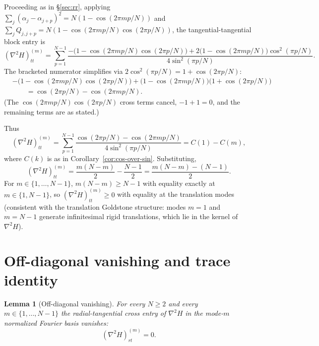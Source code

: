 \documentclass[11pt]{article}
\newtheorem{lemma}{Lemma}
\theoremstyle{remark}
\begin{document}
Proceeding as in \S\ref{sec:rr}, applying
$\sum_j (\alpha_j - \alpha_{j+p})^2 = N(1 - \cos(2\pi m p / N))$
and $\sum_j Q_{j, j+p} = N(1 - \cos(2\pi m p / N)\cos(2\pi p / N))$,
the tangential-tangential block entry is
\begin{equation}\label{eq:tt-intermediate}
  (\nabla^2 H)_{tt}^{(m)}
   = \sum_{p=1}^{N-1}
     \frac{-\bigl(1 - \cos(2\pi m p / N)\cos(2\pi p / N)\bigr)
           + 2\bigl(1 - \cos(2\pi m p / N)\bigr)\cos^2(\pi p / N)}
          {4 \sin^2(\pi p / N)}.
\end{equation}
The bracketed numerator simplifies via
$2\cos^2(\pi p / N) = 1 + \cos(2\pi p / N)$:
\begin{align*}
  &-\bigl(1 - \cos(2\pi m p / N)\cos(2\pi p / N)\bigr)
     + \bigl(1 - \cos(2\pi m p / N)\bigr)\bigl(1 + \cos(2\pi p / N)\bigr) \\
  &\qquad = \cos(2\pi p / N) - \cos(2\pi m p / N).
\end{align*}
(The $\cos(2\pi m p / N)\cos(2\pi p / N)$ cross terms cancel,
$-1 + 1 = 0$, and the remaining terms are as stated.)

Thus
\begin{equation}\label{eq:tt-diff-C}
  (\nabla^2 H)_{tt}^{(m)}
   = \sum_{p=1}^{N-1}\frac{\cos(2\pi p / N) - \cos(2\pi m p / N)}
                          {4 \sin^2(\pi p / N)}
   = C(1) - C(m),
\end{equation}
where $C(k)$ is as in Corollary~\ref{cor:cos-over-sin}. Substituting,
\begin{equation}\label{eq:tt-unshifted}
  (\nabla^2 H)_{tt}^{(m)}
   = \frac{m(N-m)}{2} - \frac{N-1}{2}
   = \frac{m(N-m) - (N-1)}{2}.
\end{equation}
For $m \in \{1, \ldots, N-1\}$, $m(N-m) \ge N-1$ with equality exactly
at $m \in \{1, N-1\}$, so $(\nabla^2 H)_{tt}^{(m)} \ge 0$ with equality
at the translation modes (consistent with the translation Goldstone
structure: modes $m = 1$ and $m = N - 1$ generate infinitesimal
rigid translations, which lie in the kernel of $\nabla^2 H$).

\section{Off-diagonal vanishing and trace identity}\label{sec:offdiag-trace}

\begin{lemma}[Off-diagonal vanishing]\label{lem:offdiag}
For every $N \ge 2$ and every $m \in \{1, \ldots, N-1\}$ the
radial-tangential cross entry of $\nabla^2 H$ in the
mode-$m$ normalized Fourier basis vanishes:
\[
  (\nabla^2 H)_{rt}^{(m)} = 0.
\]
\end{lemma}
\end{document}
